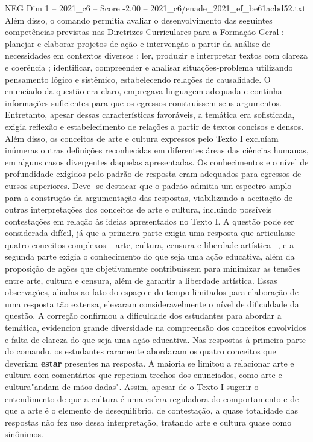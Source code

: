 \begin{textsample}{NEG Dim 1 – 2021\_c6 – Score -2.00 – 2021\_c6/enade\_2021\_ef\_be61acbd52.txt}
Além disso, o comando permitia avaliar o desenvolvimento das seguintes competências previstas nas Diretrizes Curriculares para a Formação Geral : planejar e elaborar projetos de ação e intervenção a partir da análise de necessidades em contextos diversos ; ler, produzir e interpretar textos com clareza e coerência ; identificar, compreender e analisar situações-problema utilizando pensamento lógico e sistêmico, estabelecendo relações de causalidade.
O enunciado da questão era claro, empregava linguagem adequada e continha informações suficientes para que os egressos construíssem seus argumentos.
Entretanto, apesar dessas características favoráveis, a temática era sofisticada, exigia reflexão e estabelecimento de relações a partir de textos concisos e densos.
Além disso, os conceitos de arte e cultura expressos pelo Texto I excluíam inúmeras outras definições reconhecidas em diferentes áreas das ciências humanas, em alguns casos divergentes daquelas apresentadas.
Os conhecimentos e o nível de profundidade exigidos pelo padrão de resposta eram adequados para egressos de cursos superiores.
Deve -se destacar que o padrão admitia um espectro amplo para a construção da argumentação das respostas, viabilizando a aceitação de outras interpretações dos conceitos de arte e cultura, incluindo possíveis contestações em relação às ideias apresentados no Texto I.
A questão pode ser considerada difícil, já que a primeira parte exigia uma resposta que articulasse quatro conceitos complexos – arte, cultura, censura e liberdade artística –, e a segunda parte exigia o conhecimento do que seja uma ação educativa, além da proposição de ações que objetivamente contribuíssem para minimizar as tensões entre arte, cultura e censura, além de garantir a liberdade artística.
Essas observações, aliadas ao fato do espaço e do tempo limitados para elaboração de uma resposta tão extensa, elevaram consideravelmente o nível de dificuldade da questão.
A correção confirmou a dificuldade dos estudantes para abordar a temática, evidenciou grande diversidade na compreensão dos conceitos envolvidos e falta de clareza do que seja uma ação educativa.
Nas respostas à primeira parte do comando, os estudantes raramente abordaram os quatro conceitos que deveriam \textbf{estar} presentes na resposta.
A maioria se limitou a relacionar arte e cultura com comentários que repetiam trechos dos enunciados, como arte e cultura"andam de mãos dadas".
Assim, apesar de o Texto I sugerir o entendimento de que a cultura é uma esfera reguladora do comportamento e de que a arte é o elemento de desequilíbrio, de contestação, a quase totalidade das respostas não fez uso dessa interpretação, tratando arte e cultura quase como sinônimos.

\end{textsample}

